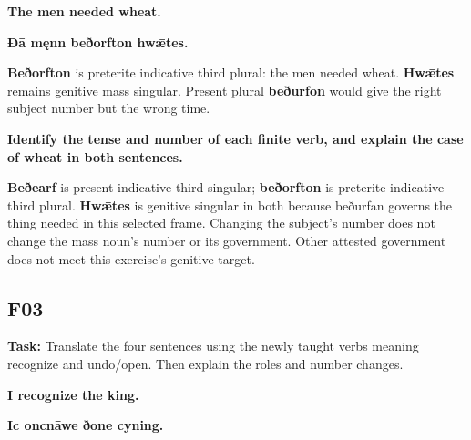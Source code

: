 \par\begin{minipage}{\linewidth}\raggedright
\textbf{The men needed wheat.}

\textbf{Ðā męnn beðorfton hwǣtes.}
\end{minipage}\par

\textbf{Beðorfton} is preterite indicative third plural: the men needed wheat. \textbf{Hwǣtes} remains genitive mass singular. Present plural \textbf{beðurfon} would give the right subject number but the wrong time.

\textbf{Identify the tense and number of each finite verb, and explain the case of wheat in both sentences.}

\textbf{Beðearf} is present indicative third singular; \textbf{beðorfton} is preterite indicative third plural. \textbf{Hwǣtes} is genitive singular in both because beðurfan governs the thing needed in this selected frame. Changing the subject’s number does not change the mass noun’s number or its government. Other attested government does not meet this exercise’s genitive target.

\subsection*{F03}

\textbf{Task:} Translate the four sentences using the newly taught verbs meaning recognize and undo/\allowbreak{}open. Then explain the roles and number changes.

\par\begin{minipage}{\linewidth}\raggedright
\textbf{I recognize the king.}

\textbf{Ic oncnāwe ðone cyning.}
\end{minipage}\par

